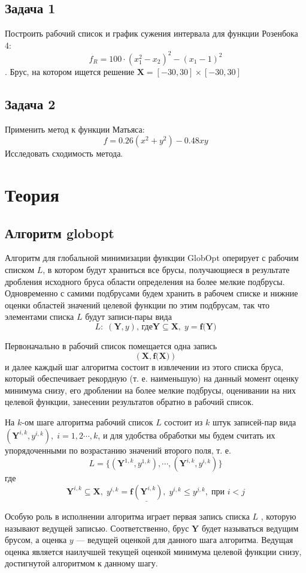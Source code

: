 \documentclass[14pt,a4paper,article]{ncc}
\begin{document}
\subsection{Задача 1}
Построить рабочий список и график сужения интервала для функции Розенбока 4:
$$ f_R = 100 \cdot (x_1^2 - x_2)^2 - (x_1 - 1)^2$$.
Брус, на котором ищется решение $\textbf{X} = [-30, 30] \times [-30, 30]$

\subsection{Задача 2}
Применить метод к функции Матьяса:
$$ f = 0.26(x^2 + y^2) - 0.48x y $$
Исследовать сходимость метода.

\section{Теория}
\subsection{Алгоритм globopt}
Алгоритм для глобальной минимизации функции GlobOpt оперирует с рабочим списком $L$, в котором будут храниться все
брусы, получающиеся в результате дробления исходного бруса области определения на более мелкие подбрусы. Одновременно с самими
подбрусами будем хранить в рабочем списке и нижние оценки областей значений целевой функции по этим подбрусам, так что
элементами списка $L$ будут записи-пары вида
$$L:\; (\textbf{Y}, y)\text{, где} \textbf{Y} \subseteq \textbf{X},\; y = \textbf{f(Y)}$$

Первоначально в рабочий список помещается одна запись
$$(\textbf{X}, \textbf{f(X)})$$
и далее каждый шаг алгоритма состоит в извлечении из этого списка
бруса, который обеспечивает рекордную (т. е. наименьшую) на данный
момент оценку минимума снизу, его дроблении на более мелкие
подбрусы, оценивании на них целевой функции, занесении результатов
обратно в рабочий список.

На $k$-ом шаге алгоритма рабочий список $L$ состоит из $k$ штук
записей-пар вида $(\textbf{Y}^{i,k},y^{i,k}),\; i=1,2\cdots,k$, и для удобства обработки
мы будем считать их упорядоченными по возрастанию значений
второго поля, т. е.
$$L = \{(\textbf{Y}^{1,k}, y^{1,k}),\cdots,(\textbf{Y}^{i,k},y^{i,k})\}$$
где 
$$\textbf{Y}^{i,k} \subseteq \textbf{X}, \;y^{i,k} = \underline{\textbf{f}(\textbf{Y}^{i,k})},\; y^{i,k} \leq y^{j,k}, \;\text{при } i < j$$

Особую роль в исполнении алгоритма играет первая запись списка $L$ ,
которую называют ведущей записью. Соответственно, брус $\textbf{Y}$ будет
называться ведущим брусом, а оценка $y$ — ведущей оценкой для
данного шага алгоритма. Ведущая оценка является наилучшей
текущей оценкой минимума целевой функции снизу, достигнутой
алгоритмом к данному шагу.
\end{document}
